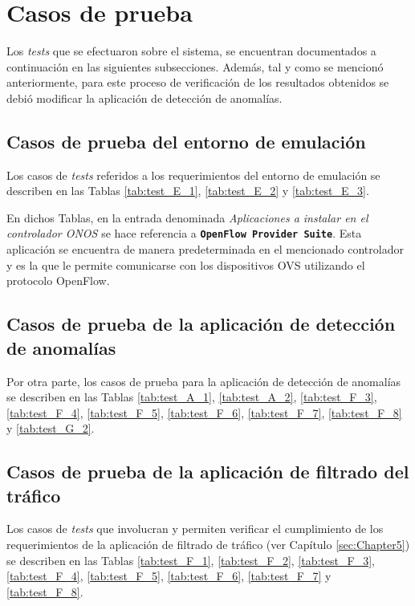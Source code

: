 \section {Casos de prueba} \label{sec:Tests}

Los \textit{tests} que se efectuaron sobre el sistema, se encuentran documentados a continuación en las siguientes subsecciones.
Además, tal y como se mencionó anteriormente, para este proceso de verificación de los resultados obtenidos se debió modificar la aplicación de detección de anomalías.

\subsection {Casos de prueba del entorno de emulación}

Los casos de \textit{tests} referidos a los requerimientos del entorno de
emulación se describen en las Tablas \ref{tab:test_E_1}, \ref{tab:test_E_2} y
\ref{tab:test_E_3}.

En dichos Tablas, en la entrada denominada \textit{Aplicaciones a instalar en el
  controlador ONOS} se hace referencia a \texttt{\textbf{OpenFlow Provider Suite}}. Esta
aplicación se encuentra de manera predeterminada en el mencionado controlador y
es la que le permite comunicarse con los dispositivos OVS utilizando el
protocolo OpenFlow.

\subsection {Casos de prueba de la aplicación de detección de anomalías}

Por otra parte, los casos de prueba para la aplicación de detección de anomalías
se describen en las Tablas \ref{tab:test_A_1}, \ref{tab:test_A_2},
\ref{tab:test_F_3}, \ref{tab:test_F_4}, \ref{tab:test_F_5}, \ref{tab:test_F_6},
\ref{tab:test_F_7}, \ref{tab:test_F_8} y \ref{tab:test_G_2}.


\subsection {Casos de prueba de la aplicación de filtrado del tráfico}

Los casos de \textit{tests} que involucran y permiten verificar el cumplimiento de los requerimientos de la aplicación de filtrado de tráfico (ver Capítulo \ref{sec:Chapter5}) se describen en las Tablas \ref{tab:test_F_1}, \ref{tab:test_F_2}, \ref{tab:test_F_3}, \ref{tab:test_F_4}, \ref{tab:test_F_5}, \ref{tab:test_F_6}, \ref{tab:test_F_7} y \ref{tab:test_F_8}.


